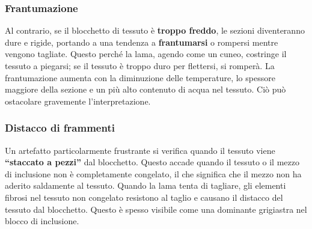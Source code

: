 \subsubsection{Frantumazione}
Al contrario, se il blocchetto di tessuto è \textbf{troppo freddo}, le sezioni diventeranno dure e rigide, portando a una tendenza a \textbf{frantumarsi} o rompersi mentre vengono tagliate.  Questo perché la lama, agendo come un cuneo, costringe il tessuto a piegarsi;  se il tessuto è troppo duro per flettersi, si romperà.  La frantumazione aumenta con la diminuzione delle temperature, lo spessore maggiore della sezione e un più alto contenuto di acqua nel tessuto. Ciò può ostacolare gravemente l'interpretazione. 

\subsubsection{Distacco di frammenti}
Un artefatto particolarmente frustrante si verifica quando il tessuto viene \textbf{``staccato a pezzi''} dal blocchetto.  Questo accade quando il tessuto o il mezzo di inclusione non è completamente congelato, il che significa che il mezzo non ha aderito saldamente al tessuto.  Quando la lama tenta di tagliare, gli elementi fibrosi nel tessuto non congelato resistono al taglio e causano il distacco del tessuto dal blocchetto.  Questo è spesso visibile come una dominante grigiastra nel blocco di inclusione. 

